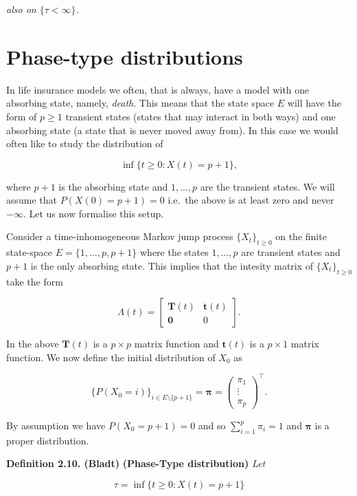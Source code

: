 \documentclass[
]{book}
\begin{document}
\emph{also on \(\{\tau <\infty\}\).}

\hypertarget{phase-type-distributions}{%
\section{Phase-type distributions}\label{phase-type-distributions}}

In life insurance models we often, that is always, have a model with one absorbing state, namely, \emph{death}. This means that the state space \(E\) will have the form of \(p\ge 1\) transient states (states that may interact in both ways) and one absorbing state (a state that is never moved away from). In this case we would often like to study the distribution of

\[
\inf\{t\ge 0 : X(t)=p+1\},
\]

where \(p+1\) is the absorbing state and \(1,...,p\) are the transient states. We will assume that \(P(X(0)=p+1)=0\) i.e.~the above is at least zero and never \(-\infty\). Let us now formalise this setup.

Consider a time-inhomogeneous Markov jump process \(\{X_t\}_{t\ge 0}\) on the finite state-space \(E=\{1,...,p,p+1\}\) where the states \(1,...,p\) are transient states and \(p+1\) is the only absorbing state. This implies that the intesity matrix of \(\{X_t\}_{t\ge 0}\) take the form

\[
\Lambda(t)=\begin{bmatrix}
\mathbf{T}(t) & \mathbf{t}(t)\\
\mathbf{0} & 0
\end{bmatrix}.
\]

In the above \(\mathbf{T}(t)\) is a \(p\times p\) matrix function and \(\mathbf{t}(t)\) is a \(p\times 1\) matrix function. We now define the initial distribution of \(X_0\) as

\[
\{P(X_0=i)\}_{i\in E\setminus \{p+1\}}=\mathbf{\pi}=\begin{pmatrix}\pi_1\\ \vdots\\ \pi_p\end{pmatrix}^\top.
\]

By assumption we have \(P(X_0=p+1)=0\) and so \(\sum_{i=1}^p\pi_i=1\) and \(\mathbf{\pi}\) is a proper distribution.

\textbf{Definition 2.10. (Bladt)} \textbf{(Phase-Type distribution)} \emph{Let}

\[
\tau = \inf\{t\ge 0 : X(t)=p+1\}
\]
\end{document}
